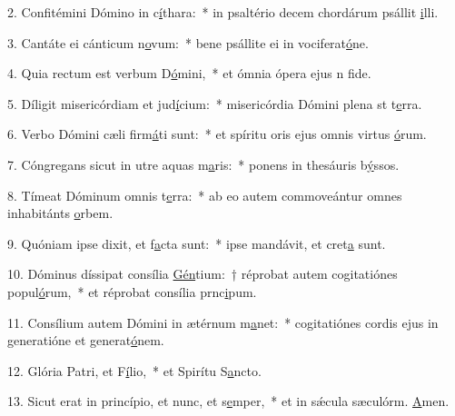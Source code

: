 2. Confitémini Dómino in c\uline{í}thara:~* in psaltério decem chordárum psállit \uline{i}lli.\par 
3. Cantáte ei cánticum n\uline{o}vum:~* bene psállite ei in vociferat\uline{ó}ne.\par 
4. Quia rectum est verbum D\uline{ó}mini,~* et ómnia ópera ejus n f\uline{i}de.\par 
5. Díligit misericórdiam et jud\uline{í}cium:~* misericórdia Dómini plena st t\uline{e}rra.\par 
6. Verbo Dómini cæli firm\uline{á}ti sunt:~* et spíritu oris ejus omnis virtus \uline{ó}rum.\par 
7. Cóngregans sicut in utre aquas m\uline{a}ris:~* ponens in thesáuris b\uline{ý}ssos.\par 
8. Tímeat Dóminum omnis t\uline{e}rra:~* ab eo autem commoveántur omnes inhabitánts \uline{o}rbem.\par 
9. Quóniam ipse dixit, et f\uline{a}cta sunt:~* ipse mandávit, et cret\uline{a} sunt.\par 
10. Dóminus díssipat consília \uline{Gén}tium:~† réprobat autem cogitatiónes popul\uline{ó}rum,~* et réprobat consília prnc\uline{i}pum.\par 
11. Consílium autem Dómini in ætérnum m\uline{a}net:~* cogitatiónes cordis ejus in generatióne et generat\uline{ó}nem.\par 
12. Glória Patri, et F\uline{í}lio,~* et Spirítu S\uline{a}ncto.\par 
13. Sicut erat in princípio, et nunc, et s\uline{e}mper,~* et in sǽcula sæculórm. \uline{A}men.\par 
